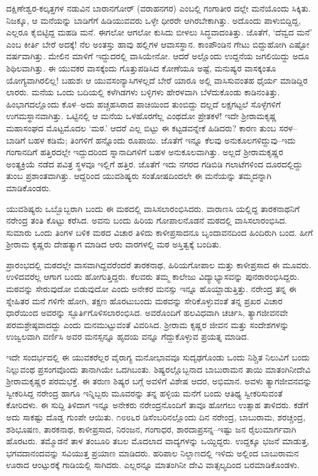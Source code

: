 ದಕ್ಷಿಣೇಶ್ವರ-ಕಲ್ಕತ್ತಗಳ ನಡುವಿನ ಬಾರಾನಗೋರ್ (ವರಾಹನಗರ) ಎಂಬಲ್ಲಿ ಗಂಗಾತೀರ ದಲ್ಲೇ ಮನೆಯೊಂದು ಸಿಕ್ಕಿತು. ನಿಜಕ್ಕೂ, ಆ ಮನೆಯನ್ನು ಬಾಡಿಗೆಗೆ ಹಿಡಿಯುವವರು ಒಳ್ಳೇ ಧೀರರೇ ಆಗಿರಬೇಕಾಗಿತ್ತು. ಅದೊಂದು ಪಾಳುಬಿದ್ದಿದ್ದ, ಎಲ್ಲರೂ ಕೈಬಿಟ್ಟಿದ್ದ ಮಹಡಿ ಮನೆ. ಈಗಲೋ ಆಗಲೋ ಕುಸಿದು ಬೀಳಲು ಸಿದ್ಧವಾದಂತಿತ್ತು. ಜೊತೆಗೆ, ‘ದೆವ್ವದ ಮನೆ’ ಎಂಬ ಕೀರ್ತಿ ಬೇರೆ ಅದಕ್ಕೆ! ನೆಲ ಅಂತಸ್ತು ಹಾವು ಹಲ್ಲಿಗಳ ಆವಾಸಸ್ಥಾನ. ಕಾಂಪೌಂಡಿನ ಗೇಟು ಬಿದ್ದುಹೋಗಿ ಎಷ್ಟೋ ವರ್ಷವಾಗಿತ್ತು. ಮೇಲಿನ ಮಾಳಿಗೆ ಇದ್ದುದರಲ್ಲಿ ವಾಸಿಯೇನೋ. ಆದರೆ ಅಲ್ಲೊಂದು ಉದ್ದನೆಯ ಜಗಲಿಯಿದ್ದು ಅದೂ ಶಿಥಿಲವಾಗಿತ್ತು. ಈ ಯುವಕರ ವಾಸಕ್ಕೆಂದು ಗೊತ್ತುಪಡಿಸಿದ ಕೋಣೆಯೂ ಅಷ್ಟೆ, ಮನುಷ್ಯರ ವಾಸಕ್ಕಂತೂ ಯೋಗ್ಯವಾಗಿರಲಿಲ್ಲ! ಬಹುಶಃ ಆ ಯುವಸಂನ್ಯಾಸಿಗಳಲ್ಲದೆ ಬೇರೆ ಯಾರೂ ಅಲ್ಲಿ ವಾಸಿಸುವಂತಹ ಧೈರ್ಯ ಮಾಡಿದ್ದಿರ ಲಾರರು. ಮನೆಯ ಒಂದು ಬದಿಯಲ್ಲಿ ಕಳೆಗಿಡಗಳು ಬಳ್ಳಿಗಳು ಹೇರಳವಾಗಿ ಬೆಳೆದುಕೊಂಡು ಕಾಡಿನಂತಿತ್ತು. ಹಿಂಭಾಗದಲ್ಲೊಂದು ಕೊಳ–ಅದು ಹಚ್ಚಹಸಿರಾದ ಪಾಚಿಯಿಂದ ತುಂಬಿದ್ದು ದಲ್ಲದೆ ಲಕ್ಷಗಟ್ಟಲೆ ಸೊಳ್ಳೆಗಳಿಗೆ ಉಗಮಸ್ಥಾನವಾಗಿತ್ತು. ಒಟ್ಟಿನಲ್ಲಿ ಆ ಮನೆಯ ಒಳಹೊರಗೆಲ್ಲ ಎಂಥದೋ ಪ್ರೇತಕಳೆ! ಇದೇ ಶ್ರೀರಾಮಕೃಷ್ಣ ಮಹಾಸಂಘದ ಮೊಟ್ಟಮೊದಲ ‘ಮಠ.’ ಆದರೆ ಎಲ್ಲ ಬಿಟ್ಟು ಈ ಕಟ್ಟಡವನ್ನೇಕೆ ಹಿಡಿದರು? ಕಾರಣ ತುಂಬ ಸರಳ–ಬಾಡಿಗೆ ಬಹಳ ಕಡಿಮೆ; ತಿಂಗಳಿಗೆ ಹನ್ನೊಂದು ರೂಪಾಯಿ. ಜೊತೆಗೆ ಇನ್ನೂ ಕೆಲವು ಅನುಕೂಲಗಳಿದ್ದುವು–ಇದು ಗಂಗಾನದಿಗೆ ಹತ್ತಿರದಲ್ಲೇ ಇದ್ದುದರಿಂದ ಸ್ನಾನಾದಿಗಳಿಗೆ ಬಹಳ ಅನುಕೂಲವಾಗಿತ್ತು. ಅಲ್ಲದೆ ಶ್ರೀರಾಮಕೃಷ್ಣರ ಅಂತ್ಯಕ್ರಿಯೆ ನಡೆದ ಪವಿತ್ರ ಸ್ಥಳವೂ ಇಲ್ಲಿಗೆ ಹತ್ತಿರ. ಜೊತೆಗೆ ಇದು ನಗರದ ಗಡಿಬಿಡಿ ಗಲಾಟೆಗಳಿಂದ ದೂರದಲ್ಲಿದ್ದು ತುಂಬ ಪ್ರಶಾಂತವಾಗಿತ್ತು. ಆದ್ದರಿಂದ ಯುವಶಿಷ್ಯರು ಸಂತೋಷದಿಂದಲೇ ಈ ಮನೆಯನ್ನು ತಮ್ಮದನ್ನಾಗಿ ಮಾಡಿಕೊಂಡರು.

ಯುವಶಿಷ್ಯರು ಒಬ್ಬೊಬ್ಬರಾಗಿ ಬಂದು ಈ ಮಠದಲ್ಲಿ ವಾಸಿಸಲಾರಂಭಿಸಿದರು. ವಾರಾಣಸಿ ಯಲ್ಲಿದ್ದ ತಾರಕನಾಥನಿಗೆ ನರೇಂದ್ರ ತಂತಿ ಕೊಟ್ಟು ಕರೆಸಿದ. ಅವನು ಬಂದು ಹಿರಿಯ ಗೋಪಾಲನೊಡನೆ ಮಠದಲ್ಲಿ ವಾಸಿಸಲಾರಂಭಿಸಿದ. ಸುಮಾರು ಒಂದು ತಿಂಗಳ ಬಳಿಕ ಮಠದ ವಿಚಾರ ತಿಳಿದು ಕಾಳೀಪ್ರಸಾದನೂ ಬೃಂದಾವನದಿಂದ ಹಿಂದಿರುಗಿ ಬಂದ. ಹೀಗೆ ಶ್ರೀರಾಮ ಕೃಷ್ಣರು ದೇಹತ್ಯಾಗ ಮಾಡಿದ ಆರು ವಾರಗಳಲ್ಲಿ ಮಠ ಅಸ್ತಿತ್ವಕ್ಕೆ ಬಂದಿತು.

ಪ್ರಾರಂಭದಲ್ಲಿ ಮಠದಲ್ಲೇ ವಾಸವಾಗಿದ್ದವರೆಂದರೆ ತಾರಕನಾಥ, ಹಿರಿಯಗೋಪಾಲ ಮತ್ತು ಕಾಳೀಪ್ರಸಾದ ಈ ಮೂವರು. ಉಳಿದವರೆಲ್ಲ ಆಗಾಗ ಬಂದು ಹೋಗುತ್ತಿದ್ದರು. ಕೆಲವರು ತಮ್ಮ ಕಾಲೇಜು ವಿದ್ಯಾಭ್ಯಾಸವನ್ನು ಪುನರಾರಂಭಿಸಿದ್ದರು. ಮಠವನ್ನು ಸೇರುವುದೋ ಬಿಡುವುದೋ ಎಂದು ಅನೇಕರ ಮನಸ್ಸು ಇನ್ನೂ ಹೊಯ್ದಾಡುತ್ತಿತ್ತು. ನರೇಂದ್ರ ತನ್ನ ಈ ಸ್ನೇಹಿತರ ಮನೆ ಗಳಿಗೇ ಹೋಗಿ, ತಕ್ಷಣ ಹೊರಟುಬಂದು ಮಠವನ್ನು ಸೇರಿಕೊಳ್ಳುವಂತೆ ತನ್ನ ಪ್ರಖರ ವಿಚಾರ ಧಾರೆಯಿಂದ ಅವರನ್ನು ಸ್ಫೂರ್ತಿಗೊಳಿಸಲಾರಂಭಿಸಿದ. ಅವರೊಂದಿಗೆ ಹಲವಿಧವಾಗಿ ಚರ್ಚಿಸಿ, ತ್ಯಾಗಜೀವನವೇ ಪರಮಶ್ರೇಷ್ಠವಾದದ್ದು ಎಂದು ಮನಮುಟ್ಟುವಂತೆ ವಿವರಿಸಿದ. ಶ್ರೀರಾಮ ಕೃಷ್ಣರ ಜೀವನ ಮತ್ತು ಸಂದೇಶಗಳನ್ನು ಉಜ್ವಲವಾಗಿ ವರ್ಣಿಸಿ ಅವರ ಮನಸ್ಸನ್ನೂ ಹೃದಯ ವನ್ನೂ ಗೆದ್ದುಕೊಳ್ಳುವ ಪ್ರಯತ್ನ ಮಾಡಿದ.

ಇದೇ ಸಂದರ್ಭದಲ್ಲಿ ಈ ಯುವಕರೆಲ್ಲರ ವೈರಾಗ್ಯ ಮನೋಭಾವವೂ ಸುದೃಢಗೊಂಡು ಒಂದು ನಿಶ್ಚಿತ ನಿಲುವಿಗೆ ಬಂದು ನಿಲ್ಲುವಂಥ ಪ್ರಸಂಗವೊಂದು ತಾನಾಗಿಯೇ ಒದಗಿಬಂತು. ಶಿಷ್ಯರಲ್ಲೊಬ್ಬನಾದ ಬಾಬುರಾಮನ ತಾಯಿ ಮಾತಂಗಿನೀದೇವಿ ಶ್ರೀರಾಮಕೃಷ್ಣರ ಪರಮಭಕ್ತೆ. ಈ ತರುಣ ಶಿಷ್ಯರ ಬಗ್ಗೆ ಅವಳಿಗೆ ವಿಶೇಷ ಆದರ, ಅಭಿಮಾನ. ಅವಳು ತ್ಯಾಗಜೀವನವನ್ನು ಸ್ವೀಕರಿಸಿದ್ದ ನರೇಂದ್ರ ಹಾಗೂ ಇನ್ನಿಬ್ಬರು ಮೂವರನ್ನು ತನ್ನ ಹಳ್ಳಿಯ ಮನೆಗೆ ಬಂದು ಆತಿಥ್ಯ ಸ್ವೀಕರಿಸುವಂತೆ ಕೋರಿದಳು. ಈ ಸುದ್ದಿ ತಿಳಿದಾಗ ಇನ್ನೂ ಅನೇಕರು ನರೇಂದ್ರನೊಂದಿಗೆ ತಾವೂ ಹೋಗಲು ಉತ್ಸಾಹ ತಾಳಿದರು. ಕಡೆಗೆ ಅದು ಸಾಕಷ್ಟು ದೊಡ್ಡ ಗುಂಪೇ ಆಯಿತು. ೧೮೮೬ರ ಡಿಸೆಂಬರಿನಲ್ಲೊಂದು ದಿನ ನರೇಂದ್ರ, ಬಾಬುರಾಮ, ಶರಚ್ಚಂದ್ರ, ಶಶಿಭೂಷಣ, ತಾರಕನಾಥ, ಕಾಳೀಪ್ರಸಾದ, ನಿರಂಜನ, ಗಂಗಾಧರ, ಶಾರದಾಪ್ರಸನ್ನ–ಇಷ್ಟು ಜನ ರೈಲುಮಾರ್ಗವಾಗಿ ಹೊರಟರು. ತಮ್ಮೊಡನೆ ತಾಳ ತಂಬೂರಿ ತಬಲ ಮೊದಲಾದ ವಾದ್ಯಗಳನ್ನು ಒಯ್ದಿದ್ದರು. ಉದ್ದಕ್ಕೂ ಭಜನೆ ಮಾಡುತ್ತ, ಭಗವದಾನಂದವನ್ನು ಸವಿಯುತ್ತ ಪ್ರಯಾಣ ಮಾಡಿದರು. ಹರಿಪಾಲ ನಿಲ್ದಾಣದಲ್ಲಿ ಇಳಿದು ಅಲ್ಲಿಂದ ಬಾಬುರಾಮನ ಊರಾದ ಆಂಟ್ಪುರಕ್ಕೆ ಗಾಡಿಯಲ್ಲಿ ಸಾಗಿದರು. ಎಲ್ಲರನ್ನೂ ಮಾತಂಗಿನೀ ದೇವಿ ವಾತ್ಸಲ್ಯದಿಂದ ಬರಮಾಡಿಕೊಂಡಳು.

